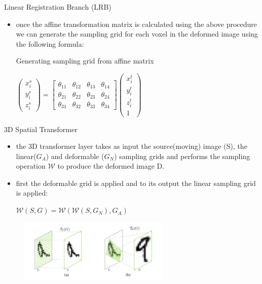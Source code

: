 \documentclass{beamer}
\begin{document}
\begin{frame}{Linear Registration Branch (LRB)}
    \begin{itemize}
        \item once the affine transformation matrix is calculated using the above procedure we can generate the sampling grid for each voxel in the deformed image using the following formula:
        \begin{block}{Generating sampling grid from affine matrix}
            \begin{center}
            $\begin{pmatrix} 
                {x}_{i}^s \\ 
                {y}_{i}^s\\ 
                {z}_{i}^s  
            \end{pmatrix}
            = 
            \begin{bmatrix} 
                \theta_{11} & \theta_{12} & \theta_{13} & \theta_{14}\\ 
                \theta_{21} & \theta_{22} & \theta_{23} & \theta_{24}\\
                \theta_{31} & \theta_{32} & \theta_{33} & \theta_{34} 
             \end{bmatrix}
            \begin{pmatrix} 
                {x}_{i}^t \\ 
                {y}_{i}^t\\ 
                {z}_{i}^t\\
                1
            \end{pmatrix}$
            \end{center}
        \end{block} 
    \end{itemize}
\end{frame}

\begin{frame}{3D Spatial Transformer}
    \begin{itemize}
        \item the 3D transformer layer takes as input the source(moving) image (S), the linear($G_A$) and deformable ($G_N$) sampling grids and  performs the sampling operation $\mathcal{W}$ to produce the deformed image D.
        \item first the deformable grid is applied and to its output the linear sampling grid is applied:
        \begin{block}{}
            \centering
            $\mathcal{W}(S,G) = \mathcal{W}(\mathcal{W}(S,G_N),G_A)$
        \end{block}
    \end{itemize}
    \begin{figure}
  		\includegraphics[height=3cm]{transformer.png}
	\end{figure}
\end{frame}
\end{document}
